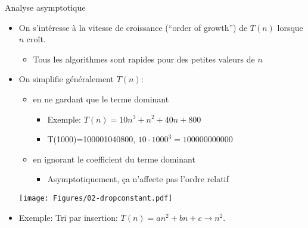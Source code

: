 \begin{frame}{Analyse asymptotique}
\begin{itemize}
\item On s'intéresse à la vitesse de croissance (``order of growth'') de $T(n)$ lorsque $n$ croît.
\begin{itemize}
\item Tous les algorithmes sont rapides pour des petites valeurs de $n$
\end{itemize}
\item On simplifie généralement $T(n)$:
\begin{itemize}
\item en ne gardant que le terme dominant
\begin{itemize}
\item Exemple: $T(n)=10 n^3+n^2+40n+800$
\item T(1000)=100001040800, $10\cdot 1000^3=100000000000$
\end{itemize}
\item en ignorant le coefficient du terme dominant
\begin{itemize}
\item Asymptotiquement, ça n'affecte pas l'ordre relatif
\end{itemize}
\end{itemize}
\centerline{\texttt{[image: Figures/02-dropconstant.pdf]}}
\item Exemple: Tri par insertion: $T(n)=an^2+bn+c \rightarrow n^2$.
\end{itemize}
\end{frame}

